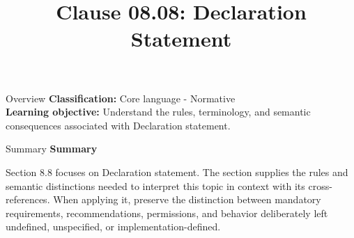 \documentclass[10pt,letterpaper]{article}
\title{Clause 08.08: Declaration Statement}
\author{}
\date{}
\begin{document}
\maketitle
\begin{CornellOverviewBox}{Overview}
\textbf{Classification:} Core language - Normative\\[2pt]
\textbf{Learning objective:} Understand the rules, terminology, and semantic consequences associated with Declaration statement.
\end{CornellOverviewBox}\begin{CornellSummaryBox}{Summary}
{\sffamily\bfseries\color{Accent} Summary}\par\vspace{3pt}Section 8.8 focuses on Declaration statement. The section supplies the rules and semantic distinctions needed to interpret this topic in context with its cross-references. When applying it, preserve the distinction between mandatory requirements, recommendations, permissions, and behavior deliberately left undefined, unspecified, or implementation-defined.
\end{CornellSummaryBox}
\end{document}

